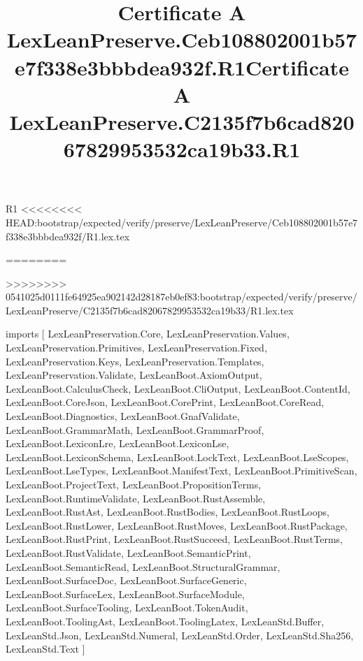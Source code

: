\begin{lexlean}{R1}
<<<<<<<< HEAD:bootstrap/expected/verify/preserve/LexLeanPreserve/Ceb108802001b57e7f338e3bbbdea932f/R1.lex.tex
\title{Certificate A LexLeanPreserve.Ceb108802001b57e7f338e3bbbdea932f.R1}
========
\title{Certificate A LexLeanPreserve.C2135f7b6cad82067829953532ca19b33.R1}
>>>>>>>> 0541025d0111fe64925ea902142d28187eb0ef83:bootstrap/expected/verify/preserve/LexLeanPreserve/C2135f7b6cad82067829953532ca19b33/R1.lex.tex
\begin{coremodule}
imports [
  LexLeanPreservation.Core,
  LexLeanPreservation.Values,
  LexLeanPreservation.Primitives,
  LexLeanPreservation.Fixed,
  LexLeanPreservation.Keys,
  LexLeanPreservation.Templates,
  LexLeanPreservation.Validate,
  LexLeanBoot.AxiomOutput,
  LexLeanBoot.CalculusCheck,
  LexLeanBoot.CliOutput,
  LexLeanBoot.ContentId,
  LexLeanBoot.CoreJson,
  LexLeanBoot.CorePrint,
  LexLeanBoot.CoreRead,
  LexLeanBoot.Diagnostics,
  LexLeanBoot.GnafValidate,
  LexLeanBoot.GrammarMath,
  LexLeanBoot.GrammarProof,
  LexLeanBoot.LexiconLre,
  LexLeanBoot.LexiconLse,
  LexLeanBoot.LexiconSchema,
  LexLeanBoot.LockText,
  LexLeanBoot.LseScopes,
  LexLeanBoot.LseTypes,
  LexLeanBoot.ManifestText,
  LexLeanBoot.PrimitiveScan,
  LexLeanBoot.ProjectText,
  LexLeanBoot.PropositionTerms,
  LexLeanBoot.RuntimeValidate,
  LexLeanBoot.RustAssemble,
  LexLeanBoot.RustAst,
  LexLeanBoot.RustBodies,
  LexLeanBoot.RustLoops,
  LexLeanBoot.RustLower,
  LexLeanBoot.RustMoves,
  LexLeanBoot.RustPackage,
  LexLeanBoot.RustPrint,
  LexLeanBoot.RustSucceed,
  LexLeanBoot.RustTerms,
  LexLeanBoot.RustValidate,
  LexLeanBoot.SemanticPrint,
  LexLeanBoot.SemanticRead,
  LexLeanBoot.StructuralGrammar,
  LexLeanBoot.SurfaceDoc,
  LexLeanBoot.SurfaceGeneric,
  LexLeanBoot.SurfaceLex,
  LexLeanBoot.SurfaceModule,
  LexLeanBoot.SurfaceTooling,
  LexLeanBoot.TokenAudit,
  LexLeanBoot.ToolingAst,
  LexLeanBoot.ToolingLatex,
  LexLeanStd.Buffer,
  LexLeanStd.Json,
  LexLeanStd.Numeral,
  LexLeanStd.Order,
  LexLeanStd.Sha256,
  LexLeanStd.Text
]


\end{coremodule}
\end{lexlean}
